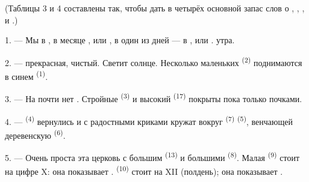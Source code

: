 %

\VUsaut{3.0mm}
\VUsaut{1.6mm}
\VUsaut{3.4mm}

(Таблицы 3 и 4 составлены так, чтобы дать в четырёх  основной запас слов о , ,
,  и .)
\VUsaut{4.0mm}

\VUsaut{3.0mm}

\VUsaut{2.4mm}

\VUsaut{3.0mm}

1. --- Мы в , в месяце ,  или
, в один из дней  --- в ,
 или .  утра.

2. ---  прекрасная,  чистый. Светит солнце.
Несколько маленьких  \textsuperscript{(2)} поднимаются в синем
 \textsuperscript{(1)}.

3. --- На  почти нет . Стройные
 \textsuperscript{(3)} и высокий  \textsuperscript{(17)}
покрыты пока только почками.

4. ---  \textsuperscript{(4)} вернулись и с радостными криками
кружат вокруг  \textsuperscript{(7)} 
\textsuperscript{(5)}, венчающей деревенскую  \textsuperscript{(6)}.

\VUsaut{3.4mm}
\VUsaut{3.0mm}

5. --- Очень проста эта церковь с большим  \textsuperscript{(13)}
и большими  \textsuperscript{(8)}. Малая 
\textsuperscript{(9)} стоит на цифре X: она показывает .
 \textsuperscript{(10)} стоит на XII (полдень); она показывает
.

